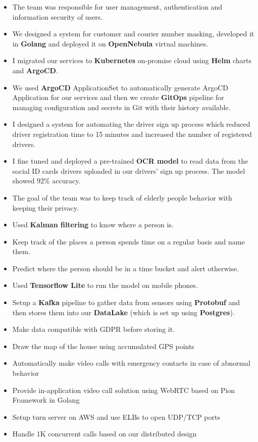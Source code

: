 \begin{itemize}
  \item The team was responsible for user management, authentication and information security of users.
  \item We designed a system for customer and courier number masking, developed it in \textbf{Golang} and deployed it on \textbf{OpenNebula} virtual machines.
  \item I migrated our services to \textbf{Kubernetes} on-promise cloud using \textbf{Helm} charts and \textbf{ArgoCD}.
  \item We used \textbf{ArgoCD} ApplicationSet to automatically generate ArgoCD Application for our services and then we create \textbf{GitOps} pipeline for managing configuration and secrets in Git with their history available.
  \item I designed a system for automating the driver sign up process which reduced driver registration time to 15 minutes and increased the number of registered drivers.
  \item I fine tuned and deployed a pre-trained \textbf{OCR model} to read data from the social ID cards drivers uploaded in our drivers' sign up process. The model showed 92\% accuracy.
\end{itemize}

\vspace{0.5cm}

\begin{itemize}
  \item The goal of the team was to keep track of elderly people behavior with keeping their privacy.
  \item Used \textbf{Kalman filtering} to know where a person is.
  \item Keep track of the places a person spends time on a regular basis and name them.
  \item Predict where the person should be in a time bucket and alert otherwise.
  \item Used \textbf{Tensorflow Lite} to run the model on mobile phones.
  \item Setup a \textbf{Kafka} pipeline to gather data from sensors using \textbf{Protobuf} and then stores them into our \textbf{DataLake} (which is set up using \textbf{Postgres}).
  \item Make data compatible with GDPR before storing it.
  \item Draw the map of the house using accumulated GPS points
  \item Automatically make video calls with emergency contacts in case of abnormal behavior
  \item Provide in-application video call solution using WebRTC based on Pion Framework in Golang
  \item Setup turn server on AWS and use ELBs to open UDP/TCP ports
  \item Handle 1K concurrent calls based on our distributed design
\end{itemize}
